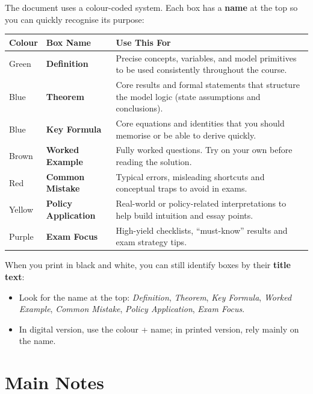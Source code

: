 \documentclass[12pt]{article}
\begin{document}
The document uses a colour-coded system. Each box has a \textbf{name} at the top so you can quickly recognise its purpose:

\begin{center}
\begin{tabular}{|l|l|p{7cm}|}
\hline
\textbf{Colour} & \textbf{Box Name} & \textbf{Use This For} \\
\hline
\colorbox{green!5}{Green} & \textbf{Definition} & Precise concepts, variables, and model primitives to be used consistently throughout the course. \\
\hline
\colorbox{blue!3}{Blue} & \textbf{Theorem} & Core results and formal statements that structure the model logic (state assumptions and conclusions). \\
\hline
\colorbox{blue!5}{Blue} & \textbf{Key Formula} & Core equations and identities that you should memorise or be able to derive quickly. \\
\hline
\colorbox{brown!5}{Brown} & \textbf{Worked Example} & Fully worked questions. Try on your own before reading the solution. \\
\hline
\colorbox{red!5}{Red} & \textbf{Common Mistake} & Typical errors, misleading shortcuts and conceptual traps to avoid in exams. \\
\hline
\colorbox{yellow!10}{Yellow} & \textbf{Policy Application} & Real-world or policy-related interpretations to help build intuition and essay points. \\
\hline
\colorbox{purple!5}{Purple} & \textbf{Exam Focus} & High-yield checklists, ``must-know'' results and exam strategy tips. \\
\hline
\end{tabular}

\end{center}

\noindent
When you print in black and white, you can still identify boxes by their \textbf{title text}:
\begin{itemize}
\item Look for the name at the top: \textit{Definition}, \textit{Theorem}, \textit{Key Formula}, \textit{Worked Example}, \textit{Common Mistake}, \textit{Policy Application}, \textit{Exam Focus}.
\item In digital version, use the colour + name; in printed version, rely mainly on the name.
\end{itemize}


\part{Main Notes}
\end{document}

